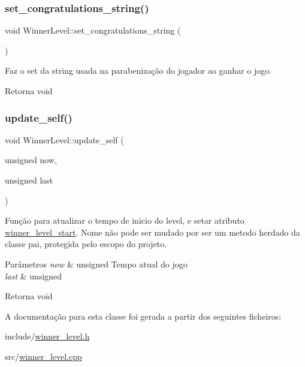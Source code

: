 \subsubsection{\texorpdfstring{set\+\_\+congratulations\+\_\+string()}{set\_congratulations\_string()}}
{\footnotesize\ttfamily void Winner\+Level\+::set\+\_\+congratulations\+\_\+string (\begin{DoxyParamCaption}{ }\end{DoxyParamCaption})\hspace{0.3cm}{\ttfamily [protected]}}



Faz o \textquotesingle{}set\textquotesingle{} da string usada na parabenização do jogador ao ganhar o jogo. 

\begin{DoxyReturn}{Retorna}
void 
\end{DoxyReturn}
\mbox{\label{classWinnerLevel_a5410c32163d0541883db5f7f54623e80}} 
\subsubsection{\texorpdfstring{update\+\_\+self()}{update\_self()}}
{\footnotesize\ttfamily void Winner\+Level\+::update\+\_\+self (\begin{DoxyParamCaption}\item[{unsigned}]{now,  }\item[{unsigned}]{last }\end{DoxyParamCaption})\hspace{0.3cm}{\ttfamily [protected]}}



Função para atualizar o tempo de inicio do level, e setar atributo \mbox{\hyperlink{classWinnerLevel_a7aaaf28d27b0f09fca07ccbdc9ee2a57}{winner\+\_\+level\+\_\+start}}. Nome não pode ser mudado por ser um metodo herdado da classe pai, protegida pelo escopo do projeto. 


\begin{DoxyParams}{Parâmetros}
{\em now} & unsigned Tempo atual do jogo \\
\hline
{\em last} & unsigned \\
\hline
\end{DoxyParams}
\begin{DoxyReturn}{Retorna}
void 
\end{DoxyReturn}


A documentação para esta classe foi gerada a partir dos seguintes ficheiros\+:\begin{DoxyCompactItemize}
\item 
include/\mbox{\hyperlink{winner__level_8h}{winner\+\_\+level.\+h}}\item 
src/\mbox{\hyperlink{winner__level_8cpp}{winner\+\_\+level.\+cpp}}\end{DoxyCompactItemize}
